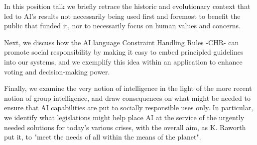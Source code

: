 \documentclass[a4paper,11pt]{article}
\begin{document}
In this position talk we briefly retrace the historic and evolutionary context that led to AI's results not necessarily being used first and foremost to benefit the public that funded it, nor to necessarily focus on human values and concerns.

Next, we discuss how the AI language Constraint Handling Rules -CHR- can promote social responsibility by making it easy to embed principled guidelines into our systems, and we exemplify this idea within an application to enhance voting and decision-making power.

Finally, we examine the very notion of intelligence in the light of the more recent notion of group intelligence, and draw consequences on what might be needed to ensure that AI capabilities are put to socially responsible uses only. In particular, we identify what legislations might help place AI at the service of the urgently needed solutions for today's various crises, with the overall aim, as K. Raworth put it, to "meet the needs of all within the means of the planet".
\end{document}
